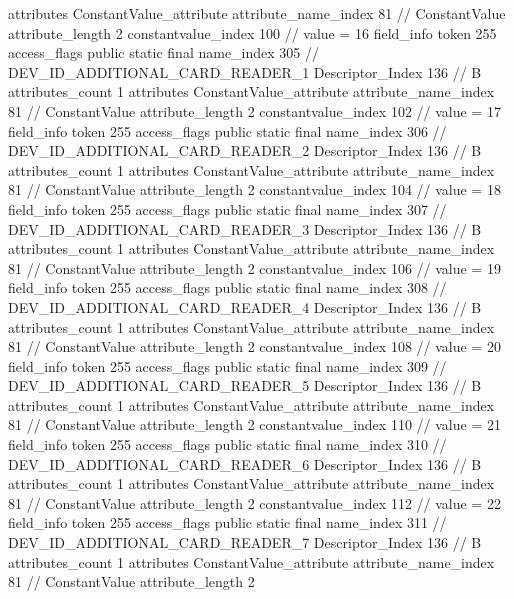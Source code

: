 {{{{{				attributes {
				ConstantValue_attribute {
					attribute_name_index	81		// ConstantValue
					attribute_length	2
					constantvalue_index	100		// value = 16
				}
				}
			}
			field_info {
				token	255
				access_flags	public static final
				name_index	305		// DEV_ID_ADDITIONAL_CARD_READER_1
				Descriptor_Index	136		// B
				attributes_count	1
				attributes {
				ConstantValue_attribute {
					attribute_name_index	81		// ConstantValue
					attribute_length	2
					constantvalue_index	102		// value = 17
				}
				}
			}
			field_info {
				token	255
				access_flags	public static final
				name_index	306		// DEV_ID_ADDITIONAL_CARD_READER_2
				Descriptor_Index	136		// B
				attributes_count	1
				attributes {
				ConstantValue_attribute {
					attribute_name_index	81		// ConstantValue
					attribute_length	2
					constantvalue_index	104		// value = 18
				}
				}
			}
			field_info {
				token	255
				access_flags	public static final
				name_index	307		// DEV_ID_ADDITIONAL_CARD_READER_3
				Descriptor_Index	136		// B
				attributes_count	1
				attributes {
				ConstantValue_attribute {
					attribute_name_index	81		// ConstantValue
					attribute_length	2
					constantvalue_index	106		// value = 19
				}
				}
			}
			field_info {
				token	255
				access_flags	public static final
				name_index	308		// DEV_ID_ADDITIONAL_CARD_READER_4
				Descriptor_Index	136		// B
				attributes_count	1
				attributes {
				ConstantValue_attribute {
					attribute_name_index	81		// ConstantValue
					attribute_length	2
					constantvalue_index	108		// value = 20
				}
				}
			}
			field_info {
				token	255
				access_flags	public static final
				name_index	309		// DEV_ID_ADDITIONAL_CARD_READER_5
				Descriptor_Index	136		// B
				attributes_count	1
				attributes {
				ConstantValue_attribute {
					attribute_name_index	81		// ConstantValue
					attribute_length	2
					constantvalue_index	110		// value = 21
				}
				}
			}
			field_info {
				token	255
				access_flags	public static final
				name_index	310		// DEV_ID_ADDITIONAL_CARD_READER_6
				Descriptor_Index	136		// B
				attributes_count	1
				attributes {
				ConstantValue_attribute {
					attribute_name_index	81		// ConstantValue
					attribute_length	2
					constantvalue_index	112		// value = 22
				}
				}
			}
			field_info {
				token	255
				access_flags	public static final
				name_index	311		// DEV_ID_ADDITIONAL_CARD_READER_7
				Descriptor_Index	136		// B
				attributes_count	1
				attributes {
				ConstantValue_attribute {
					attribute_name_index	81		// ConstantValue
					attribute_length	2
}}}}}}}
